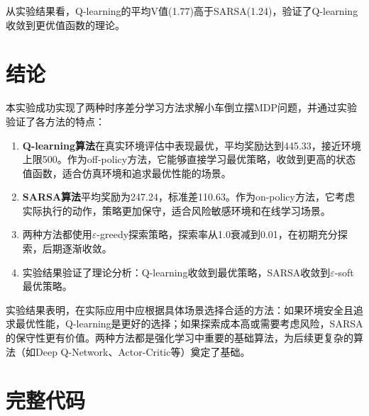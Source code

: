 \documentclass[12pt,a4paper]{article}
\begin{document}
从实验结果看，Q-learning的平均V值(1.77)高于SARSA(1.24)，验证了Q-learning收敛到更优值函数的理论。

\section{结论}

本实验成功实现了两种时序差分学习方法求解小车倒立摆MDP问题，并通过实验验证了各方法的特点：

\begin{enumerate}
    \item \textbf{Q-learning算法}在真实环境评估中表现最优，平均奖励达到445.33，接近环境上限500。作为off-policy方法，它能够直接学习最优策略，收敛到更高的状态值函数，适合仿真环境和追求最优性能的场景。
    
    \item \textbf{SARSA算法}平均奖励为247.24，标准差110.63。作为on-policy方法，它考虑实际执行的动作，策略更加保守，适合风险敏感环境和在线学习场景。
    
    \item 两种方法都使用$\varepsilon$-greedy探索策略，探索率从1.0衰减到0.01，在初期充分探索，后期逐渐收敛。
    
    \item 实验结果验证了理论分析：Q-learning收敛到最优策略，SARSA收敛到$\varepsilon$-soft最优策略。
\end{enumerate}

实验结果表明，在实际应用中应根据具体场景选择合适的方法：如果环境安全且追求最优性能，Q-learning是更好的选择；如果探索成本高或需要考虑风险，SARSA的保守性更有价值。两种方法都是强化学习中重要的基础算法，为后续更复杂的算法（如Deep Q-Network、Actor-Critic等）奠定了基础。

\newpage

\appendix

\section{完整代码}
\end{document}
